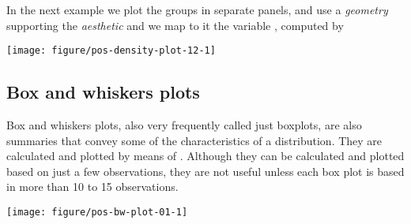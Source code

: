 \documentclass[krantz2]{krantz}\usepackage{knitr}%
\begin{document}
In the next example we plot the groups in separate panels, and use a \emph{geometry} supporting the  \emph{aesthetic} and we map to it the variable , computed by 



\begin{knitrout}\footnotesize
{}\color{fgcolor}\begin{kframe}
\begin{alltt}
  \hlopt{+}
\hlstd{(}\hlstd{(}   \hlstd{=} \hlstd{)} \hlopt{+}
  \hlstd{(}\hlopt{~}
\end{alltt}
\end{kframe}

{\centering \texttt{[image: figure/pos-density-plot-12-1]} 

}



\end{knitrout}



\subsection{Box and whiskers plots}\label{sec:boxplot}

Box and whiskers plots, also very frequently called just boxplots, are also summaries that convey some of the characteristics of a distribution. They are calculated and plotted by means of . Although they can be calculated and plotted based on just a few observations, they are not useful unless each box plot is based in more than 10 to 15 observations.

\begin{knitrout}\footnotesize
{}\color{fgcolor}\begin{kframe}
\begin{alltt}
  \hlopt{+}
  \hlstd{()}
\end{alltt}
\end{kframe}

{\centering \texttt{[image: figure/pos-bw-plot-01-1]} 

}



\end{knitrout}
\end{document}

